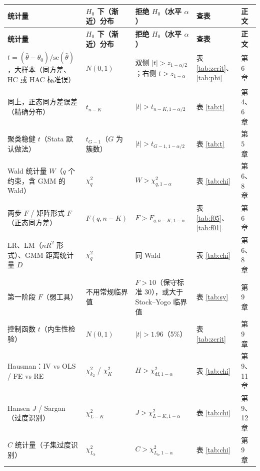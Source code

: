 {\small\renewcommand{\arraystretch}{1.12}\begin{longtable}{@{}>{\raggedright\arraybackslash}p{4.2cm}>{\raggedright\arraybackslash}p{2.8cm}>{\raggedright\arraybackslash}p{4.0cm}>{\raggedright\arraybackslash}p{1.8cm}>{\raggedright\arraybackslash}p{1.5cm}@{}}
\toprule
\textbf{统计量} & \textbf{$H_0$ 下（渐近）分布} & \textbf{拒绝 $H_0$（水平 $\alpha$）} & \textbf{查表} & \textbf{正文}\\
\midrule
\endfirsthead
\toprule
\textbf{统计量} & \textbf{$H_0$ 下（渐近）分布} & \textbf{拒绝 $H_0$（水平 $\alpha$）} & \textbf{查表} & \textbf{正文}\\
\midrule
\endhead
\bottomrule
\endlastfoot
$t=(\hat\theta-\theta_0)/\mathrm{se}(\hat\theta)$，大样本（同方差、HC 或 HAC 标准误） & $N(0,1)$ & 双侧 $|t|>z_{1-\alpha/2}$；右侧 $t>z_{1-\alpha}$ & 表 \ref{tab:zcrit}、\ref{tab:phi} & 第 6 章\\
\addlinespace[1pt]
同上，正态同方差误差（精确分布） & $t_{n-K}$ & $|t|>t_{n-K,1-\alpha/2}$ & 表 \ref{tab:t} & 第 4、6 章\\
\addlinespace[1pt]
聚类稳健 $t$（Stata 默认做法） & $t_{G-1}$（$G$ 为簇数） & $|t|>t_{G-1,1-\alpha/2}$ & 表 \ref{tab:t} & 第 5 章\\
\addlinespace[1pt]
Wald 统计量 $W$（$q$ 个约束，含 GMM 的 Wald） & $\chi^2_q$ & $W>\chi^2_{q,1-\alpha}$ & 表 \ref{tab:chi} & 第 6、8 章\\
\addlinespace[1pt]
两步 $F$ / 矩阵形式 $F$（正态同方差） & $F(q,n-K)$ & $F>F_{q,n-K;1-\alpha}$ & 表 \ref{tab:f05}、\ref{tab:f01} & 第 6 章\\
\addlinespace[1pt]
LR、LM（$nR^2$ 形式）、GMM 距离统计量 $D$ & $\chi^2_q$ & 同 Wald & 表 \ref{tab:chi} & 第 6、8 章\\
\addlinespace[1pt]
第一阶段 $F$（弱工具） & 不用常规临界值 & $F>10$（保守标准 30），或大于 Stock--Yogo 临界值 & 表 \ref{tab:sy} & 第 9 章\\
\addlinespace[1pt]
控制函数 $t$（内生性检验） & $N(0,1)$ & $|t|>1.96$（5\%） & 表 \ref{tab:zcrit} & 第 9 章\\
\addlinespace[1pt]
Hausman：IV vs OLS / FE vs RE & $\chi^2_{k_2}$ / $\chi^2_K$ & $H>\chi^2_{\mathrm{df},1-\alpha}$ & 表 \ref{tab:chi} & 第 9、11 章\\
\addlinespace[1pt]
Hansen $J$ / Sargan（过度识别） & $\chi^2_{L-K}$ & $J>\chi^2_{L-K,1-\alpha}$ & 表 \ref{tab:chi} & 第 9、12 章\\
\addlinespace[1pt]
$C$ 统计量（子集过度识别） & $\chi^2_{L_b}$ & $C>\chi^2_{L_b,1-\alpha}$ & 表 \ref{tab:chi} & 第 9 章\\

\end{longtable}}
